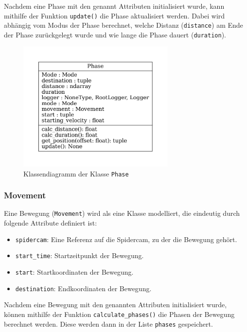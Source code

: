 Nachdem eine Phase mit den genannt Attributen initialisiert wurde, kann mithilfe der Funktion \texttt{update()} die Phase aktualisiert werden.
Dabei wird abhängig vom Modus der Phase berechnet, welche Distanz (\texttt{distance}) am Ende der Phase zurückgelegt wurde und wie lange die Phase dauert (\texttt{duration}).


\begin{figure}[H]
    \centering
    \includegraphics[width=0.7\textwidth]{../python/uml/phase.pdf}
    \caption{Klassendiagramm der Klasse \texttt{Phase}}
    \label{fig:phase}
\end{figure}

\subsubsection{Movement}
\label{sssec:movement}

Eine Bewegung (\texttt{Movement}) wird als eine Klasse modelliert, die eindeutig durch folgende Attribute definiert ist:
\begin{itemize}
    \item \texttt{spidercam}: Eine Referenz auf die Spidercam, zu der die Bewegung gehört.
    \item \texttt{start\_time}: Startzeitpunkt der Bewegung.
    \item \texttt{start}: Startkoordinaten der Bewegung.
    \item \texttt{destination}: Endkoordinaten der Bewegung.
\end{itemize}

Nachdem eine Bewegung mit den genannten Attributen initialisiert wurde, können mithilfe der Funktion \texttt{calculate\_phases()} die Phasen der Bewegung berechnet werden.
Diese werden dann in der Liste \texttt{phases} gespeichert.

